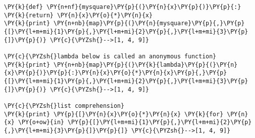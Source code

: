 \begin{Verbatim}[commandchars=\\\{\}]
\PY{k}{def} \PY{n+nf}{mysquare}\PY{p}{(}\PY{n}{x}\PY{p}{)}\PY{p}{:} \PY{k}{return} \PY{n}{x}\PY{o}{*}\PY{n}{x}
\PY{k}{print} \PY{n+nb}{map}\PY{p}{(}\PY{n}{mysquare}\PY{p}{,}\PY{p}{[}\PY{l+m+mi}{1}\PY{p}{,}\PY{l+m+mi}{2}\PY{p}{,}\PY{l+m+mi}{3}\PY{p}{]}\PY{p}{)} \PY{c}{\PYZsh{}-->[1, 4, 9]}

\PY{c}{\PYZsh{}lambda below is called an anonymous function}
\PY{k}{print} \PY{n+nb}{map}\PY{p}{(}\PY{k}{lambda}\PY{p}{(}\PY{n}{x}\PY{p}{)}\PY{p}{:}\PY{n}{x}\PY{o}{*}\PY{n}{x}\PY{p}{,}\PY{p}{[}\PY{l+m+mi}{1}\PY{p}{,}\PY{l+m+mi}{2}\PY{p}{,}\PY{l+m+mi}{3}\PY{p}{]}\PY{p}{)} \PY{c}{\PYZsh{}-->[1, 4, 9]}

\PY{c}{\PYZsh{}list comprehension}
\PY{k}{print} \PY{p}{[}\PY{n}{x}\PY{o}{*}\PY{n}{x} \PY{k}{for} \PY{n}{x} \PY{o+ow}{in} \PY{p}{[}\PY{l+m+mi}{1}\PY{p}{,}\PY{l+m+mi}{2}\PY{p}{,}\PY{l+m+mi}{3}\PY{p}{]}\PY{p}{]} \PY{c}{\PYZsh{}-->[1, 4, 9]}
\end{Verbatim}
